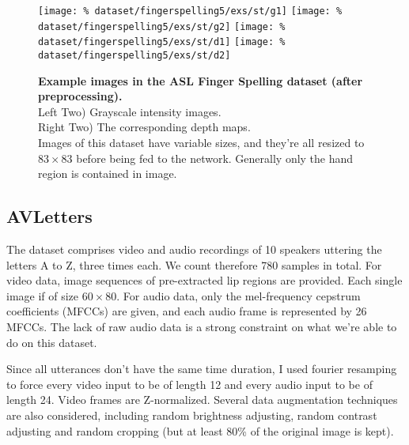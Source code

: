 \begin{figure}[H]
  \centering
  \hfill
  \texttt{[image: \%
    dataset/fingerspelling5/exs/st/g1]}
  \hfill
  \texttt{[image: \%
    dataset/fingerspelling5/exs/st/g2]}
  \hfill
  \texttt{[image: \%
    dataset/fingerspelling5/exs/st/d1]}
  \hfill
  \texttt{[image: \%
    dataset/fingerspelling5/exs/st/d2]}
  \caption{%
    \textbf{Example images in the ASL Finger Spelling dataset
      (after preprocessing).}\\[0.1em]
    Left Two) Grayscale intensity images.\\[0.1em]
    Right Two) The corresponding depth maps.\\[0.1em]
    Images of this dataset have variable sizes, and they're all resized to
      $83 \times 83$ before being fed to the network. Generally only the
      hand region is contained in image.}
  \label{fig:fingerspelling_exs}
\end{figure}

\subsection{AVLetters}

The dataset comprises video and audio recordings of 10 speakers
uttering the letters A to Z, three times each.
We count therefore 780 samples in total. For video data, image sequences
of pre-extracted lip regions are provided.
Each single image if of size $60 \times 80$.
For audio data, only the mel-frequency cepstrum coefficients (MFCCs)
are given, and each audio frame is represented by 26 MFCCs.
The lack of raw audio data is a strong constraint on what we're able to do
on this dataset.

Since all utterances don't have the same time duration, I used
fourier resamping to force every video input to be of length 12 and
every audio input to be of length 24. Video frames are Z-normalized.
Several data augmentation techniques
are also considered, including random brightness adjusting, random contrast
adjusting and random cropping (but at least 80\% of the original image
is kept).

